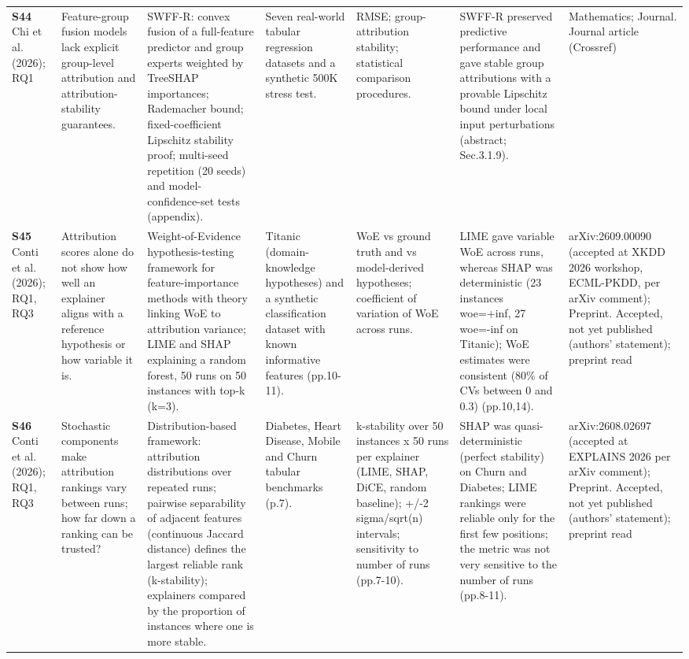 \begin{longtable}{@{}P{1.55cm}P{2.9cm}P{4.5cm}P{3.2cm}P{3.4cm}P{4.6cm}P{3.6cm}@{}}
\textbf{S44} \cite{S44} Chi et al. (2026); RQ1 & Feature-group fusion models lack explicit group-level attribution and attribution-stability guarantees. & SWFF-R: convex fusion of a full-feature predictor and group experts weighted by TreeSHAP importances; Rademacher bound; fixed-coefficient Lipschitz stability proof; multi-seed repetition (20 seeds) and model-confidence-set tests (appendix). & Seven real-world tabular regression datasets and a synthetic 500K stress test. & RMSE; group-attribution stability; statistical comparison procedures. & SWFF-R preserved predictive performance and gave stable group attributions with a provable Lipschitz bound under local input perturbations (abstract; Sec.3.1.9). & Mathematics; Journal. Journal article (Crossref) \\
\textbf{S45} \cite{S45} Conti et al. (2026); RQ1, RQ3 & Attribution scores alone do not show how well an explainer aligns with a reference hypothesis or how variable it is. & Weight-of-Evidence hypothesis-testing framework for feature-importance methods with theory linking WoE to attribution variance; LIME and SHAP explaining a random forest, 50 runs on 50 instances with top-k (k=3). & Titanic (domain-knowledge hypotheses) and a synthetic classification dataset with known informative features (pp.10-11). & WoE vs ground truth and vs model-derived hypotheses; coefficient of variation of WoE across runs. & LIME gave variable WoE across runs, whereas SHAP was deterministic (23 instances woe=+inf, 27 woe=-inf on Titanic); WoE estimates were consistent (80\% of CVs between 0 and 0.3) (pp.10,14). & arXiv:2609.00090 (accepted at XKDD 2026 workshop, ECML-PKDD, per arXiv comment); Preprint. Accepted, not yet published (authors' statement); preprint read \\
\textbf{S46} \cite{S46} Conti et al. (2026); RQ1, RQ3 & Stochastic components make attribution rankings vary between runs; how far down a ranking can be trusted? & Distribution-based framework: attribution distributions over repeated runs; pairwise separability of adjacent features (continuous Jaccard distance) defines the largest reliable rank (k-stability); explainers compared by the proportion of instances where one is more stable. & Diabetes, Heart Disease, Mobile and Churn tabular benchmarks (p.7). & k-stability over 50 instances x 50 runs per explainer (LIME, SHAP, DiCE, random baseline); +/\allowbreak{}-2 sigma/\allowbreak{}sqrt(n) intervals; sensitivity to number of runs (pp.7-10). & SHAP was quasi-deterministic (perfect stability) on Churn and Diabetes; LIME rankings were reliable only for the first few positions; the metric was not very sensitive to the number of runs (pp.8-11). & arXiv:2608.02697 (accepted at EXPLAINS 2026 per arXiv comment); Preprint. Accepted, not yet published (authors' statement); preprint read \\

\end{longtable}
